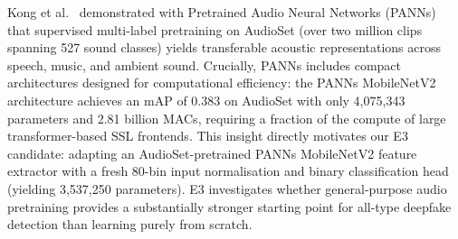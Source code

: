 \documentclass[12pt,a4paper]{report}
\begin{document}
Kong et al.~\cite{kong2020panns} demonstrated with Pretrained Audio Neural Networks (PANNs) that supervised multi-label pretraining on AudioSet (over two million clips spanning 527 sound classes) yields transferable acoustic representations across speech, music, and ambient sound. Crucially, PANNs includes compact architectures designed for computational efficiency: the PANNs MobileNetV2 architecture achieves an mAP of 0.383 on AudioSet with only 4,075,343 parameters and 2.81 billion MACs, requiring a fraction of the compute of large transformer-based SSL frontends. This insight directly motivates our E3 candidate: adapting an AudioSet-pretrained PANNs MobileNetV2 feature extractor with a fresh 80-bin input normalisation and binary classification head (yielding 3,537,250 parameters). E3 investigates whether general-purpose audio pretraining provides a substantially stronger starting point for all-type deepfake detection than learning purely from scratch.
\end{document}
